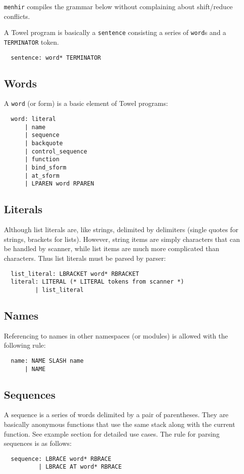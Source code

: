 \documentclass{article}
\begin{document}
\texttt{menhir} compiles the grammar below without complaining about shift/reduce conflicts.

A Towel program is basically a \texttt{sentence} consisting a series of \texttt{word}s and a \texttt{TERMINATOR} token.
\begin{verbatim}
  sentence: word* TERMINATOR
\end{verbatim}

\subsection{Words}

A \texttt{word} (or form) is a basic element of Towel programs:
\begin{verbatim}
  word: literal
      | name
      | sequence
      | backquote
      | control_sequence
      | function
      | bind_sform
      | at_sform
      | LPAREN word RPAREN
\end{verbatim}

\subsection{Literals}

Although list literals are, like strings, delimited by delimiters (single quotes for strings, brackets for lists). However, string items are simply characters that can be handled by scanner, while list items are much more complicated than characters. Thus list literals must be parsed by parser:
\begin{verbatim}
  list_literal: LBRACKET word* RBRACKET
  literal: LITERAL (* LITERAL tokens from scanner *)
         | list_literal
\end{verbatim}

\subsection{Names}

Referencing to names in other namespaces (or modules) is allowed with the following rule:
\begin{verbatim}
  name: NAME SLASH name
      | NAME
\end{verbatim}

\subsection{Sequences}

A sequence is a series of words delimited by a pair of parentheses. They are basically anonymous functions that use the same stack along with the current function. See example section for detailed use cases. The rule for parsing sequences is as follows:
\begin{verbatim}
  sequence: LBRACE word* RBRACE
          | LBRACE AT word* RBRACE
\end{verbatim}
\end{document}
